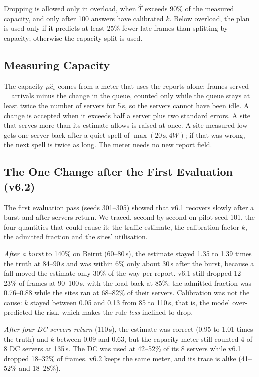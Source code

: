 \documentclass[conference]{IEEEtran}
\newcommand{\That}{\hat{T}}
\begin{document}
Dropping is allowed only in overload, when $\That$ exceeds 90\% of the measured capacity, and only after 100 answers have calibrated $k$. Below overload, the plan is used only if it predicts at least 25\% fewer late frames than splitting by capacity; otherwise the capacity split is used.

\subsection{Measuring Capacity}\label{sec:meter}
The capacity $\mu\hat c_s$ comes from a meter that uses the reports alone: frames served = arrivals minus the change in the queue, counted only while the queue stays at least twice the number of servers for 5\,s, so the servers cannot have been idle. A change is accepted when it exceeds half a server plus two standard errors. A site that serves more than its estimate allows is raised at once. A site measured low gets one server back after a quiet spell of $\max(20\,\mathrm{s}, 4W)$; if that was wrong, the next spell is twice as long. The meter needs no new report field.

\subsection{The One Change after the First Evaluation (v6.2)}\label{sec:v62}
The first evaluation pass (seeds 301--305) showed that v6.1 recovers slowly after a burst and after servers return. We traced, second by second on pilot seed 101, the four quantities that could cause it: the traffic estimate, the calibration factor $k$, the admitted fraction and the sites' utilisation.

\emph{After a burst} to 140\% on Beirut (60--80\,s), the estimate stayed 1.35 to 1.39 times the truth at 84--90\,s and was within 6\% only about 30\,s after the burst, because a fall moved the estimate only 30\% of the way per report. v6.1 still dropped 12--23\% of frames at 90--100\,s, with the load back at 85\%: the admitted fraction was 0.76--0.88 while the sites ran at 68--82\% of their servers. Calibration was not the cause: $k$ stayed between 0.05 and 0.13 from 85 to 110\,s, that is, the model over-predicted the risk, which makes the rule \emph{less} inclined to drop.

\emph{After four DC servers return} (110\,s), the estimate was correct (0.95 to 1.01 times the truth) and $k$ between 0.09 and 0.63, but the capacity meter still counted 4 of 8 DC servers at 135\,s. The DC was used at 42--52\% of its 8 servers while v6.1 dropped 18--32\% of frames. v6.2 keeps the same meter, and its trace is alike (41--52\% and 18--28\%).
\end{document}
